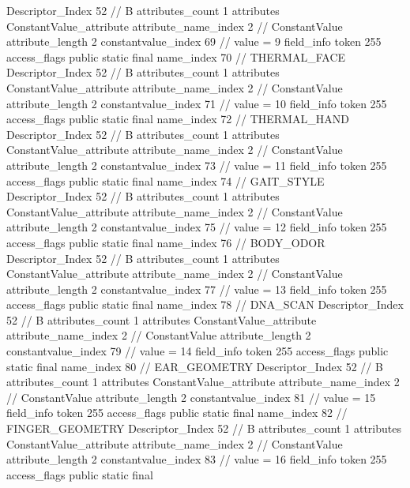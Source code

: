 {{{{{				Descriptor_Index	52		// B
				attributes_count	1
				attributes {
				ConstantValue_attribute {
					attribute_name_index	2		// ConstantValue
					attribute_length	2
					constantvalue_index	69		// value = 9
				}
				}
			}
			field_info {
				token	255
				access_flags	public static final
				name_index	70		// THERMAL_FACE
				Descriptor_Index	52		// B
				attributes_count	1
				attributes {
				ConstantValue_attribute {
					attribute_name_index	2		// ConstantValue
					attribute_length	2
					constantvalue_index	71		// value = 10
				}
				}
			}
			field_info {
				token	255
				access_flags	public static final
				name_index	72		// THERMAL_HAND
				Descriptor_Index	52		// B
				attributes_count	1
				attributes {
				ConstantValue_attribute {
					attribute_name_index	2		// ConstantValue
					attribute_length	2
					constantvalue_index	73		// value = 11
				}
				}
			}
			field_info {
				token	255
				access_flags	public static final
				name_index	74		// GAIT_STYLE
				Descriptor_Index	52		// B
				attributes_count	1
				attributes {
				ConstantValue_attribute {
					attribute_name_index	2		// ConstantValue
					attribute_length	2
					constantvalue_index	75		// value = 12
				}
				}
			}
			field_info {
				token	255
				access_flags	public static final
				name_index	76		// BODY_ODOR
				Descriptor_Index	52		// B
				attributes_count	1
				attributes {
				ConstantValue_attribute {
					attribute_name_index	2		// ConstantValue
					attribute_length	2
					constantvalue_index	77		// value = 13
				}
				}
			}
			field_info {
				token	255
				access_flags	public static final
				name_index	78		// DNA_SCAN
				Descriptor_Index	52		// B
				attributes_count	1
				attributes {
				ConstantValue_attribute {
					attribute_name_index	2		// ConstantValue
					attribute_length	2
					constantvalue_index	79		// value = 14
				}
				}
			}
			field_info {
				token	255
				access_flags	public static final
				name_index	80		// EAR_GEOMETRY
				Descriptor_Index	52		// B
				attributes_count	1
				attributes {
				ConstantValue_attribute {
					attribute_name_index	2		// ConstantValue
					attribute_length	2
					constantvalue_index	81		// value = 15
				}
				}
			}
			field_info {
				token	255
				access_flags	public static final
				name_index	82		// FINGER_GEOMETRY
				Descriptor_Index	52		// B
				attributes_count	1
				attributes {
				ConstantValue_attribute {
					attribute_name_index	2		// ConstantValue
					attribute_length	2
					constantvalue_index	83		// value = 16
				}
				}
			}
			field_info {
				token	255
				access_flags	public static final
}}}}}
